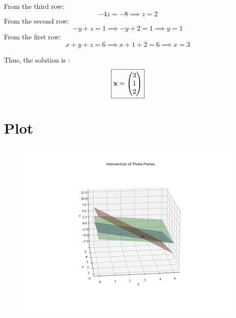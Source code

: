 \documentclass[14pt]{extarticle}
\begin{document}
From the third row:
\[
-4z = -8 \implies z = 2
\]
From the second row:
\[
-y + z = 1 \implies -y + 2 = 1 \implies y = 1
\]
From the first row:
\[
x + y + z = 6 \implies x + 1 + 2 = 6 \implies x = 3
\]

Thus, the solution is :
\[
\boxed{
\mathbf{x} = \begin{pmatrix}3 \\ 1 \\ 2\end{pmatrix}
}
\]
\newpage
\section*{Plot}
\begin{figure}[!h]
    \centering
    \includegraphics[width=1.2\columnwidth]{Figs/Figure_1.png}
\end{figure}
\end{document}
